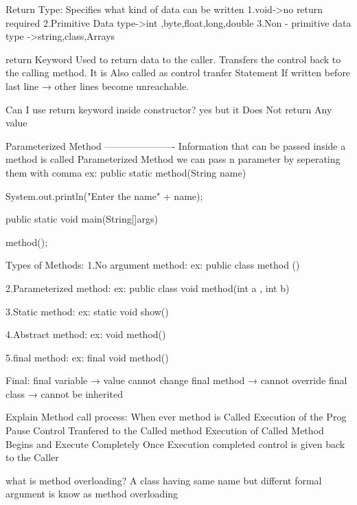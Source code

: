   Return Type:
         Specifies what kind of data can be written
         1.void->no return required
         2.Primitive Data type->int ,byte,float,long,double
         3.Non - primitive data type ->string,class,Arrays
   
   return Keyword
      Used to return data to the caller.
      Transfers the control back to the calling method.
      It is Also called as control tranfer Statement
      If written before last line → other lines become unreachable.
   

Can I use return keyword inside constructor?
   yes but it Does Not return Any value



Parameterized Method
----------------------
             Information that can be passed inside a method is called Parameterized Method
             we can pass n parameter by seperating them with comma
             ex:
                public static method(String name){
                  System.out.println("Enter the name" + name);

                }


                public static void main(String[]args){
                  method();
                  
                }



   Types of Methods:
   1.No argument method:
     ex:
        public class method (){}
   
   2.Parameterized method: 
     ex:
        public class void method(int a , int b){}

   3.Static method:
      ex:
        static void show(){}

   4.Abstract method:
      ex:
        void method(){  }
   
   5.final method:
      ex:
       final void method(){}

Final:
final variable → value cannot change
final method → cannot override
final class → cannot be inherited



Explain Method call process:
     When ever method is Called Execution of the Prog Pause
     Control Tranfered to the Called method 
     Execution of Called Method Begins and Execute Completely
     Once Execution completed control is given back to the Caller


what is method overloading?
A class having same name but differnt formal argument is know as method overloading

